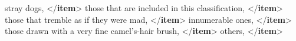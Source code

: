 \documentclass[11pt,twoside]{article}\makeatletter
\begin{document}
\begin{shaded}
\hspace*{6pt} stray\mbox{}\newline 
\hspace*{6pt}\hspace*{6pt}\hspace*{6pt}\hspace*{6pt} dogs, {</\textbf{item}>}\mbox{}\newline 
\hspace*{6pt} those that are included in this\mbox{}\newline 
\hspace*{6pt}\hspace*{6pt}\hspace*{6pt}\hspace*{6pt} classification, {</\textbf{item}>}\mbox{}\newline 
\hspace*{6pt} those that tremble as if they\mbox{}\newline 
\hspace*{6pt}\hspace*{6pt}\hspace*{6pt}\hspace*{6pt} were mad, {</\textbf{item}>}\mbox{}\newline 
\hspace*{6pt} innumerable ones, {</\textbf{item}>}\mbox{}\newline 
\hspace*{6pt} those\mbox{}\newline 
\hspace*{6pt}\hspace*{6pt}\hspace*{6pt}\hspace*{6pt} drawn with a very fine camel's-hair brush, {</\textbf{item}>}\mbox{}\newline 
\hspace*{6pt}others, {</\textbf{item}>}\mbox{}\newline 

\end{shaded}
\end{document}
